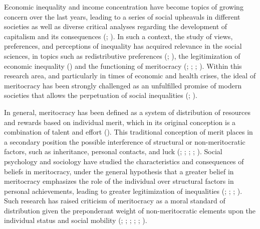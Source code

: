 \documentclass[
  10pt,
  a4paper,
]{article}
\begin{document}
Economic inequality and income concentration have become topics of growing concern over the last years, leading to a series of social upheavals in different societies as well as diverse critical analyses regarding the development of capitalism and its consequences (; ). In such a context, the study of views, preferences, and perceptions of inequality has acquired relevance in the social sciences, in topics such as redistributive preferences (; ), the legitimization of economic inequality () and the functioning of meritocracy (; ; ; ). Within this research area, and particularly in times of economic and health crises, the ideal of meritocracy has been strongly challenged as an unfulfilled promise of modern societies that allows the perpetuation of social inequalities (; ).

In general, meritocracy has been defined as a system of distribution of resources and rewards based on individual merit, which in its original conception is a combination of talent and effort (). This traditional conception of merit places in a secondary position the possible interference of structural or non-meritocratic factors, such as inheritance, personal contacts, and luck (; ; ; ; ). Social psychology and sociology have studied the characteristics and consequences of beliefs in meritocracy, under the general hypothesis that a greater belief in meritocracy emphasizes the role of the individual over structural factors in personal achievements, leading to greater legitimization of inequalities (; ; ; ). Such research has raised criticism of meritocracy as a moral standard of distribution given the preponderant weight of non-meritocratic elements upon the individual status and social mobility (; ; ; ; ; ).
\end{document}
